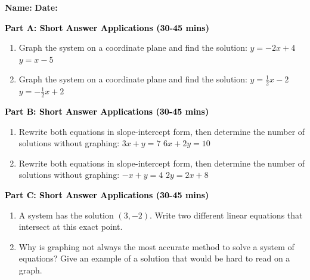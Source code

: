 \documentclass[12pt, letterpaper, fleqn]{article}
\begin{document}
\textbf{Name:} \underline{\hspace{5cm}}
\hfill
\textbf{Date:} \underline{\hspace{3cm}}\\


\begin{tcolorbox}[colback=customteal!20]
\large\textcolor{black}{\textbf{Part A: Short Answer Applications (30-45 mins)}}
\end{tcolorbox}

\vspace{3mm}

\begin{enumerate}[itemsep=4.2cm, leftmargin=0.6cm]
\item Graph the system on a coordinate plane and find the solution: 
$y = -2x + 4$ 
$y = x - 5$
\item Graph the system on a coordinate plane and find the solution:
$y = \frac{1}{2}x - 2$
$y = -\frac{1}{2}x + 2$
\end{enumerate}

\newpage

\begin{tcolorbox}[colback=customteal!20]
\large\textcolor{black}{\textbf{Part B: Short Answer Applications (30-45 mins)}}
\end{tcolorbox}

\vspace{3mm}

\begin{enumerate}[itemsep=4.2cm, leftmargin=0.6cm, resume]
\item Rewrite both equations in slope-intercept form, then determine the number of solutions without graphing:
$3x + y = 7$
$6x + 2y = 10$
\item Rewrite both equations in slope-intercept form, then determine the number of solutions without graphing:
$-x + y = 4$
$2y = 2x + 8$
\end{enumerate}

\newpage

\begin{tcolorbox}[colback=customteal!20]
\large\textcolor{black}{\textbf{Part C: Short Answer Applications (30-45 mins)}}
\end{tcolorbox}

\vspace{3mm}

\begin{enumerate}[itemsep=4.2cm, leftmargin=0.6cm, resume]
\item A system has the solution $(3, -2)$. Write two different linear equations that intersect at this exact point.
\item Why is graphing not always the most accurate method to solve a system of equations? Give an example of a solution that would be hard to read on a graph.
\end{enumerate}
\end{document}
